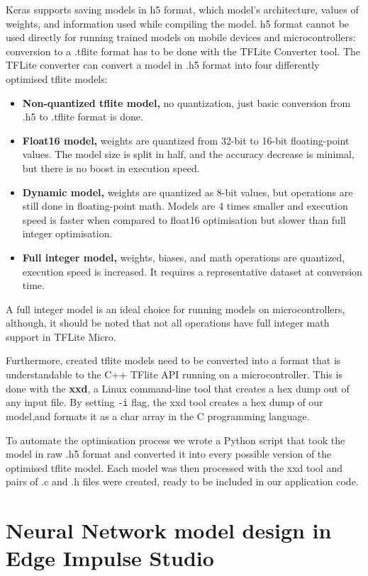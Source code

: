 Keras supports saving models in h5 format, which model's architecture, values of weights, and information used while compiling the model.
h5 format cannot be used directly for running trained models on mobile devices and microcontrollers: conversion to a .tflite format has to be done with the TFLite Converter tool.
\clearpage
The TFLite converter can convert a model in .h5 format into four differently optimised tflite models:
\begin{itemize}
    \item \textbf{Non-quantized tflite model,} no quantization, just basic conversion from .h5 to .tflite format is done.
    \item \textbf{Float16 model,} weights are quantized from 32-bit to 16-bit floating-point values. The model size is split in half, and the accuracy decrease is minimal, but there is no boost in execution speed.
    \item \textbf{Dynamic model,} weights are quantized as 8-bit values, but operations are still done in floating-point math. Models are 4 times smaller and execution speed is faster when compared to float16 optimisation but slower than full integer optimisation.
    \item \textbf{Full integer model,} weights, biases, and math operations are quantized, execution speed is increased. It requires a representative dataset at conversion time.
\end{itemize}

A full integer model is an ideal choice for running models on microcontrollers, although, it should be noted that not all operations have full integer math support in TFLite Micro.

Furthermore, created tflite models need to be converted into a format that is understandable to the C++ TFlite API running on a microcontroller.
This is done with the \textbf{xxd}, a Linux command-line tool that creates a hex dump out of any input file.
By setting \verb|-i| flag, the xxd tool creates a hex dump of our model,and formats it as a char array in the C programming language. 

To automate the optimisation process we wrote a Python script that took the model in raw .h5 format and converted it into every possible version of the optimised tflite model.
Each model was then processed with the xxd tool and pairs of .c and .h files were created, ready to be included in our application code.


\section{ Neural Network model design in Edge Impulse Studio}

